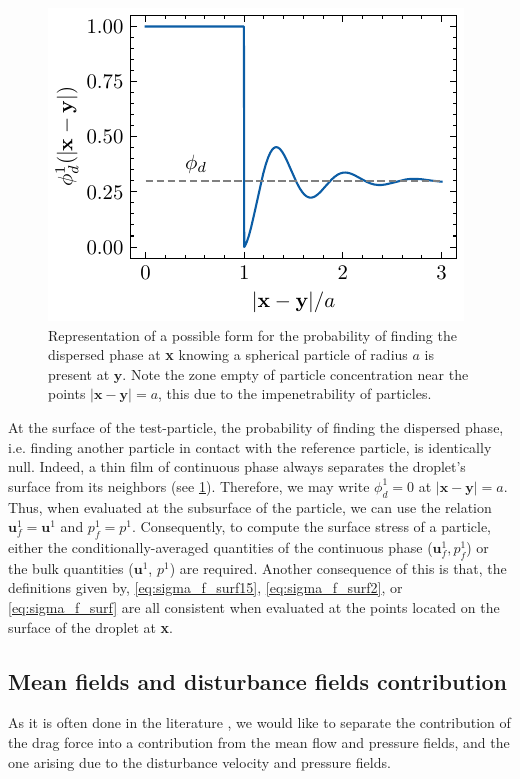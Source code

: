 \begin{figure}[h!]
    \centering
    \includegraphics[width=0.2\textheight]{image/dist_phi.pdf}
    \caption{Representation of a possible form for the probability of finding the dispersed phase at \textbf{x} knowing a spherical particle of radius $a$ is present at $\textbf{y}$.
    Note the zone empty of particle concentration near the points $|\textbf{x}- \textbf{y}|=a$, this due to the impenetrability of particles. 
    }
    \label{fig:distrib}
\end{figure}
At the surface of the test-particle, the probability of finding the dispersed phase, i.e. finding another particle in contact with the reference particle, is identically null. 
Indeed, a thin film of continuous phase always separates the droplet's surface from its neighbors (see \ref{fig:distrib}).
Therefore, we may write $\phi_d^1 = 0$ at $|\textbf{x}- \textbf{y}| =a$. 
Thus, when evaluated at the subsurface of the particle, we can use the relation $\textbf{u}_f^1 = \textbf{u}^1$ and $p_f^1 = p^1$. 
Consequently, to compute the surface stress of a particle, either the conditionally-averaged quantities of the continuous phase ($\textbf{u}_f^1, p_f^1$) or the bulk quantities ($\textbf{u}^1$, $p^1$) are required. 
Another consequence of this is that, the definitions given by, \ref{eq:sigma_f_surf15}, \ref{eq:sigma_f_surf2}, or \ref{eq:sigma_f_surf} are all consistent when evaluated at the points located on the surface of the droplet at \textbf{x}. 

\subsection{Mean fields and disturbance fields contribution}

As it is often done in the literature \citep{zhang1994ensemble,jackson2000,wang2021numerical,wang2024effect}, we would like to separate the contribution of the drag force into a contribution from the mean flow and pressure fields, and the one arising due to the disturbance velocity and pressure fields.  

